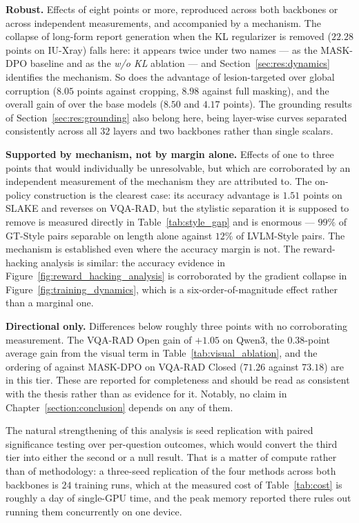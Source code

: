 \textbf{Robust.} Effects of eight points or more, reproduced across both backbones or across independent measurements, and accompanied by a mechanism. The collapse of long-form report generation when the KL regularizer is removed ($22.28$ points on IU-Xray) falls here: it appears twice under two names --- as the MASK-DPO baseline and as the \emph{w/o KL} ablation --- and Section~\ref{sec:res:dynamics} identifies the mechanism. So does the advantage of lesion-targeted over global corruption ($8.05$ points against cropping, $8.98$ against full masking), and the overall gain of \ourloss{} over the base models ($8.50$ and $4.17$ points). The grounding results of Section~\ref{sec:res:grounding} also belong here, being layer-wise curves separated consistently across all $32$ layers and two backbones rather than single scalars.

\textbf{Supported by mechanism, not by margin alone.} Effects of one to three points that would individually be unresolvable, but which are corroborated by an independent measurement of the mechanism they are attributed to. The on-policy construction is the clearest case: its accuracy advantage is $1.51$ points on SLAKE and reverses on VQA-RAD, but the stylistic separation it is supposed to remove is measured directly in Table~\ref{tab:style_gap} and is enormous --- $99\%$ of GT-Style pairs separable on length alone against $12\%$ of LVLM-Style pairs. The mechanism is established even where the accuracy margin is not. The reward-hacking analysis is similar: the accuracy evidence in Figure~\ref{fig:reward_hacking_analysis} is corroborated by the gradient collapse in Figure~\ref{fig:training_dynamics}, which is a six-order-of-magnitude effect rather than a marginal one.

\textbf{Directional only.} Differences below roughly three points with no corroborating measurement. The VQA-RAD Open gain of $+1.05$ on Qwen3, the $0.38$-point average gain from the visual term in Table~\ref{tab:visual_ablation}, and the ordering of \ourloss{} against MASK-DPO on VQA-RAD Closed ($71.26$ against $73.18$) are in this tier. These are reported for completeness and should be read as consistent with the thesis rather than as evidence for it. Notably, no claim in Chapter~\ref{section:conclusion} depends on any of them.

The natural strengthening of this analysis is seed replication with paired significance testing over per-question outcomes, which would convert the third tier into either the second or a null result. That is a matter of compute rather than of methodology: a three-seed replication of the four methods across both backbones is $24$ training runs, which at the measured cost of Table~\ref{tab:cost} is roughly a day of single-GPU time, and the peak memory reported there rules out running them concurrently on one device.

